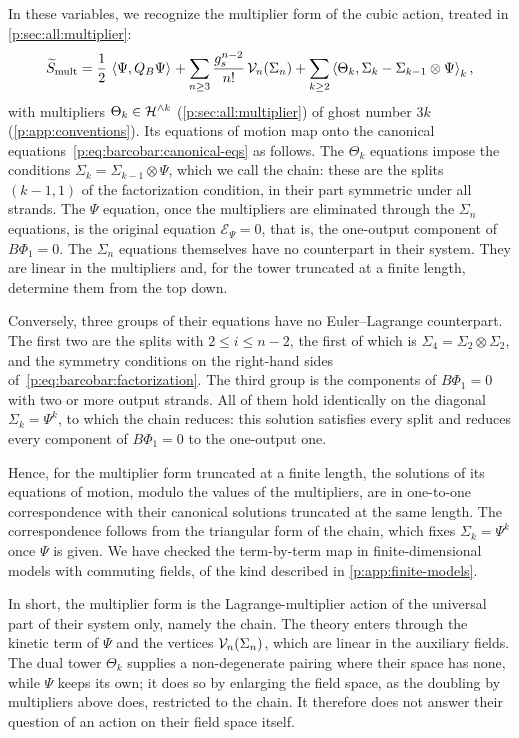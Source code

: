 In these variables, we recognize the multiplier form of the cubic action, treated in \cref{p:sec:all:multiplier}:
\begin{equation}
  \label{p:eq:barcobar:multiplier-action}
  \caction[\mathrm{mult}]
    = \frac{1}{2} \, \pair{\Psi}{Q_B \Psi}
      + \sum_{n \ge 3} \frac{\gs^{n-2}}{n!} \, \vertex{n}(\Sigma_n)
      + \sum_{k \ge 2} \pair[k]{\Theta_k}{\Sigma_k - \Sigma_{k-1} \otimes \Psi},
\end{equation}
with multipliers $\Theta_k \in \Hn{k}$ (\cref{p:sec:all:multiplier}) of ghost number $3 k$ (\cref{p:app:conventions}).
Its equations of motion map onto the canonical equations~\eqref{p:eq:barcobar:canonical-eqs} as follows.
The $\Theta_k$ equations impose the conditions $\Sigma_k = \Sigma_{k-1} \otimes \Psi$, which we call the chain: these are the splits $(k - 1, 1)$ of the factorization condition, in their part symmetric under all strands.
The $\Psi$ equation, once the multipliers are eliminated through the $\Sigma_n$ equations, is the original equation $\mathcal E_\Psi = 0$, that is, the one-output component of $B \Phi_1 = 0$.
The $\Sigma_n$ equations themselves have no counterpart in their system. They are linear in the multipliers and, for the tower truncated at a finite length, determine them from the top down.

Conversely, three groups of their equations have no Euler--Lagrange counterpart.
The first two are the splits with $2 \le i \le n - 2$, the first of which is $\Sigma_4 = \Sigma_2 \otimes \Sigma_2$, and the symmetry conditions on the right-hand sides of~\eqref{p:eq:barcobar:factorization}.
The third group is the components of $B \Phi_1 = 0$ with two or more output strands.
All of them hold identically on the diagonal $\Sigma_k = \Psi^k$, to which the chain reduces: this solution satisfies every split and reduces every component of $B \Phi_1 = 0$ to the one-output one.

Hence, for the multiplier form truncated at a finite length, the solutions of its equations of motion, modulo the values of the multipliers, are in one-to-one correspondence with their canonical solutions truncated at the same length.
The correspondence follows from the triangular form of the chain, which fixes $\Sigma_k = \Psi^k$ once $\Psi$ is given.
We have checked the term-by-term map in finite-dimensional models with commuting fields, of the kind described in \cref{p:app:finite-models}.

In short, the multiplier form is the Lagrange-multiplier action of the universal part of their system only, namely the chain.
The theory enters through the kinetic term of $\Psi$ and the vertices $\vertex{n}(\Sigma_n)$, which are linear in the auxiliary fields.
The dual tower $\Theta_k$ supplies a non-degenerate pairing where their space has none, while $\Psi$ keeps its own; it does so by enlarging the field space, as the doubling by multipliers above does, restricted to the chain. It therefore does not answer their question of an action on their field space itself.
